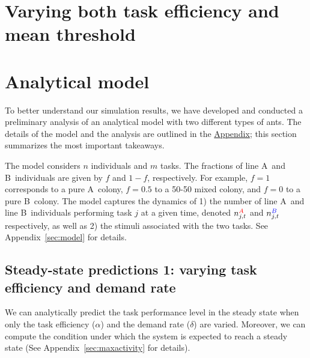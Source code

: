 \documentclass[11pt]{article}
\newcommand{\A}{{\color{red}A}}
\newcommand{\B}{{\color{blue}B}}
\begin{document}
\section{Varying both task efficiency and mean threshold} \label{sec:varyalphamu}

\section{Analytical model} \label{sec:analytical}

To better understand our simulation results, we have developed and conducted a preliminary analysis of an analytical model with two different types of ants.  The details of the model and the analysis are outlined in the \hyperref[sec:appendix]{Appendix}; this section summarizes the most important takeaways.

The model considers $n$ individuals and $m$ tasks. The fractions of line \A\ and \B\ individuals are given by $f$ and $1-f$, respectively. For example, $f=1$ corresponds to a pure \A\ colony, $f = 0.5$ to a 50-50 mixed colony, and $f = 0$ to a pure \B\ colony. 
The model captures the dynamics of 1) the number of line \A\ and line \B\ individuals performing task $j$ at a given time, denoted $n_{j,t}^{\A}$ and $n_{j,t}^{\B}$ respectively, as well as 2) the stimuli associated with the two tasks. See Appendix~\ref{sec:model} for details.

\subsection{Steady-state predictions 1: varying task efficiency and demand rate} \label{sec:sspred1}
We can analytically predict the task performance level in the steady state when only the task efficiency ($\alpha$) and the demand rate ($\delta$) are varied. Moreover, we can compute the condition under which the system is expected to reach a steady state (See Appendix~\ref{sec:maxactivity} for details). 
\end{document}
